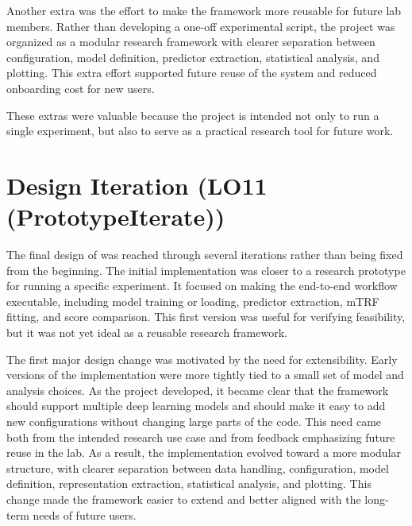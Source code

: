 \documentclass{article}
\begin{document}
Another extra was the effort to make the framework more reusable for future lab members.
Rather than developing a one-off experimental script, the project was organized as a modular research framework with clearer separation between configuration, model definition, predictor extraction, statistical analysis, and plotting.
This extra effort supported future reuse of the system and reduced onboarding cost for new users.

These extras were valuable because the project is intended not only to run a single experiment, but also to serve as a practical research tool for future work.













\section{Design Iteration (LO11 (PrototypeIterate))}

The final design of \progname{} was reached through several iterations rather than being fixed from the beginning.
The initial implementation was closer to a research prototype for running a specific experiment.
It focused on making the end-to-end workflow executable, including model training or loading, predictor extraction, mTRF fitting, and score comparison.
This first version was useful for verifying feasibility, but it was not yet ideal as a reusable research framework.

The first major design change was motivated by the need for extensibility.
Early versions of the implementation were more tightly tied to a small set of model and analysis choices.
As the project developed, it became clear that the framework should support multiple deep learning models and should make it easy to add new configurations without changing large parts of the code.
This need came both from the intended research use case and from feedback emphasizing future reuse in the lab.
As a result, the implementation evolved toward a more modular structure, with clearer separation between data handling, configuration, model definition, representation extraction, statistical analysis, and plotting.
This change made the framework easier to extend and better aligned with the long-term needs of future users.
\end{document}
